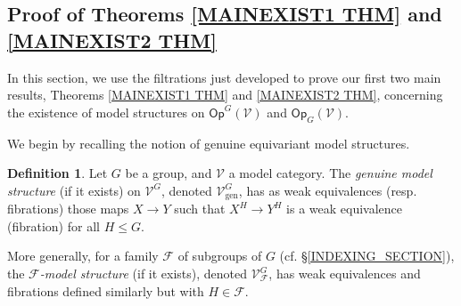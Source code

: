 \documentclass[a4paper,10pt
,draft
]{article}%
\numberwithin{equation}{section}
\numberwithin{figure}{section}
\theoremstyle{definition} %
\newtheorem{definition}[equation]{Definition}%
\newcommand{\Sym}{\ensuremath{\mathsf{Sym}}}%
\DeclareMathOperator{\Lan}{Lan}%
\newcommand{\F}{\ensuremath{\mathcal F}}
\newcommand{\V}{\ensuremath{\mathcal V}}
\renewcommand{\P}{\ensuremath{\mathcal P}}
\newcommand{\1}{\ensuremath{\mathbbm 1}}%
\begin{document}


\subsection{Proof of Theorems \ref{MAINEXIST1 THM} and \ref{MAINEXIST2 THM}}
\label{MAINEXIST SEC}



In this section, we use the filtrations just developed to prove our first two main results,
Theorems \ref{MAINEXIST1 THM} and \ref{MAINEXIST2 THM},
concerning the existence of model structures on 
$\mathsf{Op}^G(\mathcal{V})$
and
$\mathsf{Op}_G(\mathcal{V})$.

We begin by recalling the notion of genuine equivariant model structures.

\begin{definition}\label{GENUINEMS_DEF}
      Let $G$ be a group, and $\V$ a model category.
      The \textit{genuine model structure} (if it exists)
      on $\mathcal{V}^{G}$,
      denoted $\mathcal{V}^{G}_{\text{gen}}$,
      has as weak equivalences (resp. fibrations)
      those maps $X \to Y$ such that 
      $X^H \to Y^H$ is a weak equivalence (fibration)
      for all $H \leq G$.

	More generally, for a family 
	$\F$ of subgroups of $G$
	(cf. \S \ref{INDEXING_SECTION}),
      the \textit{$\F$-model structure} (if it exists), denoted $\mathcal V^G_{\F}$,
      has weak equivalences and fibrations defined
      similarly but with $H \in \F$.
\end{definition}
\end{document}
